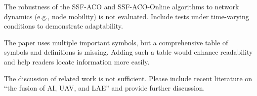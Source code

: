 \begin{revcomment}
	The robustness of the SSF-ACO and SSF-ACO-Online algorithms to network dynamics (e.g., node mobility) is not evaluated. Include tests under time-varying conditions to demonstrate adaptability.
\end{revcomment}
\begin{revresponse}
	
\end{revresponse}

\begin{revcomment}
	The paper uses multiple important symbols, but a comprehensive table of symbols and definitions is missing. Adding such a table would enhance readability and help readers locate information more easily.
\end{revcomment}
\begin{revresponse}
	
\end{revresponse}

\begin{revcomment}
	The discussion of related work is not sufficient. Please include recent literature on ``the fusion of AI, UAV, and LAE'' and provide further discussion.
\end{revcomment}
\begin{revresponse}
	
\end{revresponse}

